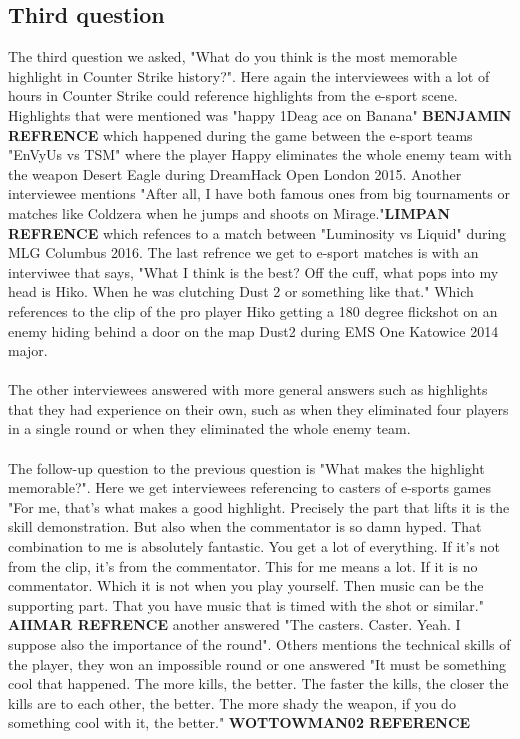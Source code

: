 \subsection{Third question}
The third question we asked, "What do you think is the most memorable highlight in Counter Strike history?". Here again the interviewees with a lot of hours in Counter Strike could reference highlights from the e-sport scene. Highlights that were mentioned was "happy 1Deag ace on Banana" \textbf{BENJAMIN REFRENCE} which happened during the game between the e-sport teams "EnVyUs vs TSM" where the player Happy eliminates the whole enemy team with the weapon Desert Eagle during DreamHack Open London 2015. Another interviewee mentions "After all, I have both famous ones from big tournaments or matches like Coldzera when he jumps and shoots on Mirage."\textbf{LIMPAN REFRENCE} which refences to a match between "Luminosity vs Liquid" during MLG Columbus 2016. The last refrence we get to e-sport matches is with an interviwee that says, "What I think is the best? Off the cuff, what pops into my head is Hiko. When he was clutching Dust 2 or something like that." Which references to the clip of the pro player Hiko getting a 180 degree flickshot on an enemy hiding behind a door on the map Dust2 during EMS One Katowice 2014 major.\\\\
The other interviewees answered with more general answers such as highlights that they had experience on their own, such as when they eliminated four players in a single round or when they eliminated the whole enemy team.\\\\
The follow-up question to the previous question is "What makes the highlight memorable?". Here we get interviewees referencing to casters of e-sports games "For me, that's what makes a good highlight. Precisely the part that lifts it is the skill demonstration. But also when the commentator is so damn hyped. That combination to me is absolutely fantastic. You get a lot of everything. If it's not from the clip, it's from the commentator. This for me means a lot. If it is no commentator. Which it is not when you play yourself. Then music can be the supporting part. That you have music that is timed with the shot or similar." \textbf{AIIMAR REFRENCE} another answered "The casters. Caster. Yeah. I suppose also the importance of the round". Others mentions the technical skills of the player, they won an impossible round or one answered "It must be something cool that happened. The more kills, the better. The faster the kills, the closer the kills are to each other, the better. The more shady the weapon, if you do something cool with it, the better." \textbf{WOTTOWMAN02 REFERENCE}\\\\
